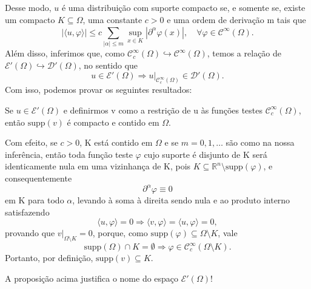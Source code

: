 \documentclass[../distribution_theory_notes.tex]{subfiles}
\begin{document}
Desse modo, \(u\) é uma distribuição com suporte compacto se, e somente se, existe um compacto \(K\subseteq \Omega \), uma constante \(c> 0\) e uma ordem de derivação m tais que
\[
	| \langle u, \varphi  \rangle | \leq c \sum\limits_{| \alpha  |\leq m}^{}\sup_{x\in K}| \partial^{\alpha }\varphi (x) |, \quad \forall \varphi \in \mathcal{C}^{\infty}(\Omega ).
\]
Além disso, inferimos que, como \(\mathcal{C}_{c}^{\infty}(\Omega )\hookrightarrow \mathcal{C}^{\infty}(\Omega )\), temos a relação de \(\mathcal{E}'(\Omega )\hookrightarrow \mathcal{D}'(\Omega )\), no sentido que
\[
	u\in \mathcal{E}'(\Omega ) \Rightarrow u|_{\mathcal{C}_{c}^{\infty}(\Omega )} \in \mathcal{D}'(\Omega ).
\]
Com isso, podemos provar os seguintes resultados:
\begin{prop*}
	Se \(u\in \mathcal{E}'(\Omega )\) e definirmos v como a restrição de u às funções testes \(\mathcal{C}_{c}^{\infty}(\Omega )\), então \(\mathrm{supp}(v)\) é compacto e contido em \(\Omega \).
\end{prop*}
\begin{proof*}
	Com efeito, se \(c > 0\), K está contido em \(\Omega \) e se \(m=0, 1,\dotsc \) são como na nossa inferência, então toda função teste \(\varphi \) cujo suporte é disjunto de K será identicamente nula em uma vizinhança de K, pois \(K\subseteq \mathbb{R}^{n}\setminus{\mathrm{supp}(\varphi )}\), e consequentemente
	\[
		\partial^{\alpha }\varphi \equiv 0
	\]
	em K para todo \(\alpha \), levando à soma à direita sendo nula e ao produto interno satisfazendo
	\[
		\langle u, \varphi  \rangle = 0 \Rightarrow \langle v, \varphi  \rangle=\langle u, \varphi  \rangle=0,
	\]
	provando que \(v|_{\Omega \setminus{K}}=0\), porque, como \(\mathrm{supp}(\varphi )\subseteq \Omega \setminus{K}\), vale
	\[
		\mathrm{supp}(\Omega )\cap K = \emptyset \Rightarrow \varphi \in \mathcal{C}_{c}^{\infty}(\Omega \setminus{K}).
	\]
	Portanto, por definição, \(\mathrm{supp}(v)\subseteq K\). \qedsymbol
\end{proof*}
\begin{tcolorbox}[
		skin=enhanced,
		title=Observação,
		fonttitle=\bfseries,
		colframe=black,
		colbacktitle=cyan!75!white,
		colback=cyan!15,
		colbacklower=black,
		coltitle=black,
		drop fuzzy shadow,
	]
	A proposição acima justifica o nome do espaço \(\mathcal{E}'(\Omega )\)!
\end{tcolorbox}
\end{document}
